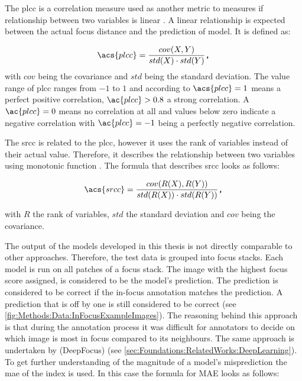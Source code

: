 The \ac{plcc}  is a correlation measure used as another metric to measures if relationship between two variables is linear \cite{profillidis2019statistical}. A linear relationship is expected between the actual focus distance and the prediction of model. It is defined as:

$$\acs{plcc} = \frac{cov(X,Y)}{std(X) \cdot std(Y)} \texttt{,}$$
with $cov$ being the covariance and $std$ being the standard deviation. The value range of \ac{plcc} ranges from $-1$ to $1$ and according to \textcite{profillidis2019statistical} $\acs{plcc} = 1$ means a perfect positive correlation, $\ac{plcc} > 0.8$ a strong correlation. A $\ac{plcc} = 0$ means no correlation at all and values below zero indicate a negative correlation with $\ac{plcc} = -1$ being a perfectly negative correlation.


The \ac{srcc}  is related to the \ac{plcc}, however it uses the rank of variables instead of their actual value. Therefore, it describes the relationship between two variables using monotonic function . The formula that describes \ac{srcc} looks as follows:

$$\acs{srcc} = \frac{cov(R(X),R(Y))}{std(R(X)) \cdot std(R(Y))} \texttt{,}$$

with $R$ the rank of variables, $std$ the standard deviation and $cov$ being the covariance.





The output of the models developed in this thesis is not directly comparable to other approaches. Therefore, the test data is grouped into focus stacks. Each model is run on all patches of a focus stack. The image with the highest focus score assigned, is considered to be the model's prediction. The prediction is considered to be correct if the in-focus annotation matches the prediction. A prediction that is off by one is still considered to be correct (see \autoref{fig:Methods:Data:InFocusExampleImages}).
The reasoning behind this approach is that during the annotation process it was difficult for annotators to decide on which image is most in focus compared to its neighbours. The same approach is undertaken by \citeauthor{senaras2018deepfocus} (DeepFocus) \cite{senaras2018deepfocus} (see \autoref{sec:Foundations:RelatedWorks:DeepLearning}). To get further understanding of the magnitude of a model's misprediction the \ac{mae} of the index is used. In this case the formula for MAE looks as follows:

